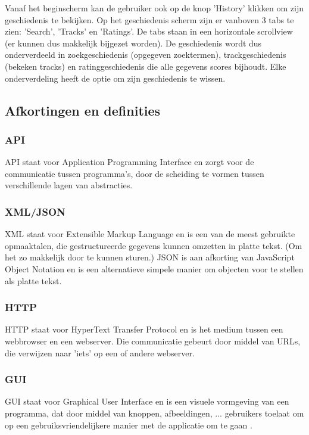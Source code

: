 \documentclass[11pt,a4paper]{article}
\begin{document}
Vanaf het beginscherm kan de gebruiker ook op de knop 'History' klikken om zijn geschiedenis te bekijken. Op het geschiedenis scherm zijn er vanboven 3 tabs te zien: 'Search', 'Tracks' en 'Ratings'.  De tabs staan in een horizontale scrollview (er kunnen dus makkelijk bijgezet worden). De geschiedenis wordt dus onderverdeeld in zoekgeschiedenis (opgegeven zoektermen), trackgeschiedenis (bekeken tracks) en ratinggeschiedenis die alle gegevens scores bijhoudt. Elke onderverdeling heeft de optie om zijn geschiedenis te wissen.
	
	
	\subsection{Afkortingen en definities}
	\label{sec:Afkortingen en definities}
		\subsubsection{API}
		\label{sec:API}
		API staat voor Application Programming Interface en zorgt voor de communicatie tussen programma's, door de scheiding te vormen tussen verschillende lagen van abstracties.
		\subsubsection{XML/JSON}
		\label{sec:XML/JSON}
		XML staat voor Extensible Markup Language en is een van de meest gebruikte opmaaktalen, die gestructureerde gegevens kunnen omzetten in platte tekst. (Om het zo makkelijk door te kunnen sturen.)
		\newline
		JSON is aan afkorting van JavaScript Object Notation en is een alternatieve simpele manier om objecten voor te stellen als platte tekst.
		\subsubsection{HTTP}
		\label{sec:HTTP}
		HTTP staat voor HyperText Transfer Protocol en is het medium tussen een webbrowser en een webserver. Die communicatie gebeurt door middel van URLs, die verwijzen naar 'iets' op een of andere webserver.
		\subsubsection{GUI}
		\label{sec:GUI}
		GUI staat voor Graphical User Interface en is een visuele vormgeving van een programma, dat door middel van knoppen, afbeeldingen, ... gebruikers toelaat om op een gebruiksvriendelijkere manier met de applicatie om te gaan .
		
\end{document}
